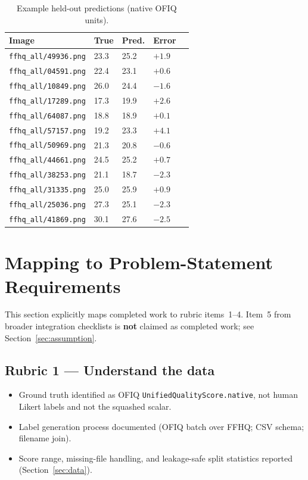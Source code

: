 \documentclass[12pt, letterpaper, titlepage]{article}
\newcommand{\TableHere}[1][0.34\textheight]{%
  \Needspace{#1}%
  \begin{table}[H]%
}
\begin{document}
\TableHere[14\baselineskip]
\caption{Example held-out predictions (native OFIQ units).}
\label{tab:examples}
\centering
\footnotesize
\begin{tabularx}{\textwidth}{|L{0.34\textwidth}|C{0.14\textwidth}|C{0.14\textwidth}|C{0.14\textwidth}|Y|}
\hline
\textbf{Image} & \textbf{True} & \textbf{Pred.} & \textbf{Error} & \\
\hline
\texttt{ffhq\_all/49936.png} & 23.3 & 25.2 & $+1.9$ & \\
\hline
\texttt{ffhq\_all/04591.png} & 22.4 & 23.1 & $+0.6$ & \\
\hline
\texttt{ffhq\_all/10849.png} & 26.0 & 24.4 & $-1.6$ & \\
\hline
\texttt{ffhq\_all/17289.png} & 17.3 & 19.9 & $+2.6$ & \\
\hline
\texttt{ffhq\_all/64087.png} & 18.8 & 18.9 & $+0.1$ & \\
\hline
\texttt{ffhq\_all/57157.png} & 19.2 & 23.3 & $+4.1$ & \\
\hline
\texttt{ffhq\_all/50969.png} & 21.3 & 20.8 & $-0.6$ & \\
\hline
\texttt{ffhq\_all/44661.png} & 24.5 & 25.2 & $+0.7$ & \\
\hline
\texttt{ffhq\_all/38253.png} & 21.1 & 18.7 & $-2.3$ & \\
\hline
\texttt{ffhq\_all/31335.png} & 25.0 & 25.9 & $+0.9$ & \\
\hline
\texttt{ffhq\_all/25036.png} & 27.3 & 25.1 & $-2.3$ & \\
\hline
\texttt{ffhq\_all/41869.png} & 30.1 & 27.6 & $-2.5$ & \\
\hline
\end{tabularx}
\end{table}

\FloatBarrier
\section{Mapping to Problem-Statement Requirements}
\label{sec:rubric}

This section explicitly maps completed work to rubric items~1--4. Item~5 from broader integration checklists is \textbf{not} claimed as completed work; see Section~\ref{sec:assumption}.

\subsection{Rubric 1 --- Understand the data}

\begin{itemize}[leftmargin=*]
    \item Ground truth identified as OFIQ \texttt{UnifiedQualityScore.native}, not human Likert labels and not the squashed scalar.
    \item Label generation process documented (OFIQ batch over FFHQ; CSV schema; filename join).
    \item Score range, missing-file handling, and leakage-safe split statistics reported (Section~\ref{sec:data}).
\end{itemize}
\end{document}
